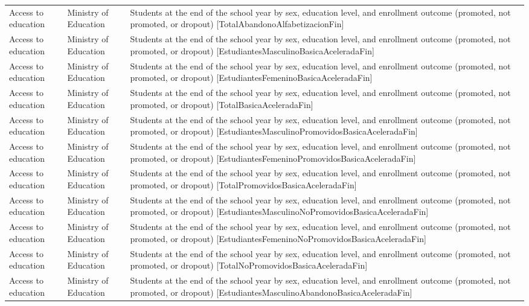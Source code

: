 \documentclass[10pt,a4paper]{article}
\begin{document}
\begin{longtable}{@{}>{\raggedright\arraybackslash}p{3.5cm}>{\raggedright\arraybackslash}p{5.6cm}>{\raggedright\arraybackslash}p{\dimexpr\textwidth-9.1cm-4\tabcolsep\relax}@{}}
Access to education & Ministry of Education & Students at the end of the school year by sex, education level, and enrollment outcome (promoted, not promoted, or dropout) [TotalAbandonoAlfabetizacionFin]\\
Access to education & Ministry of Education & Students at the end of the school year by sex, education level, and enrollment outcome (promoted, not promoted, or dropout) [EstudiantesMasculinoBasicaAceleradaFin]\\
Access to education & Ministry of Education & Students at the end of the school year by sex, education level, and enrollment outcome (promoted, not promoted, or dropout) [EstudiantesFemeninoBasicaAceleradaFin]\\
Access to education & Ministry of Education & Students at the end of the school year by sex, education level, and enrollment outcome (promoted, not promoted, or dropout) [TotalBasicaAceleradaFin]\\
Access to education & Ministry of Education & Students at the end of the school year by sex, education level, and enrollment outcome (promoted, not promoted, or dropout) [EstudiantesMasculinoPromovidosBasicaAceleradaFin]\\
Access to education & Ministry of Education & Students at the end of the school year by sex, education level, and enrollment outcome (promoted, not promoted, or dropout) [EstudiantesFemeninoPromovidosBasicaAceleradaFin]\\
Access to education & Ministry of Education & Students at the end of the school year by sex, education level, and enrollment outcome (promoted, not promoted, or dropout) [TotalPromovidosBasicaAceleradaFin]\\
Access to education & Ministry of Education & Students at the end of the school year by sex, education level, and enrollment outcome (promoted, not promoted, or dropout) [EstudiantesMasculinoNoPromovidosBasicaAceleradaFin]\\
Access to education & Ministry of Education & Students at the end of the school year by sex, education level, and enrollment outcome (promoted, not promoted, or dropout) [EstudiantesFemeninoNoPromovidosBasicaAceleradaFin]\\
Access to education & Ministry of Education & Students at the end of the school year by sex, education level, and enrollment outcome (promoted, not promoted, or dropout) [TotalNoPromovidosBasicaAceleradaFin]\\
Access to education & Ministry of Education & Students at the end of the school year by sex, education level, and enrollment outcome (promoted, not promoted, or dropout) [EstudiantesMasculinoAbandonoBasicaAceleradaFin]\\

\end{longtable}
\end{document}
